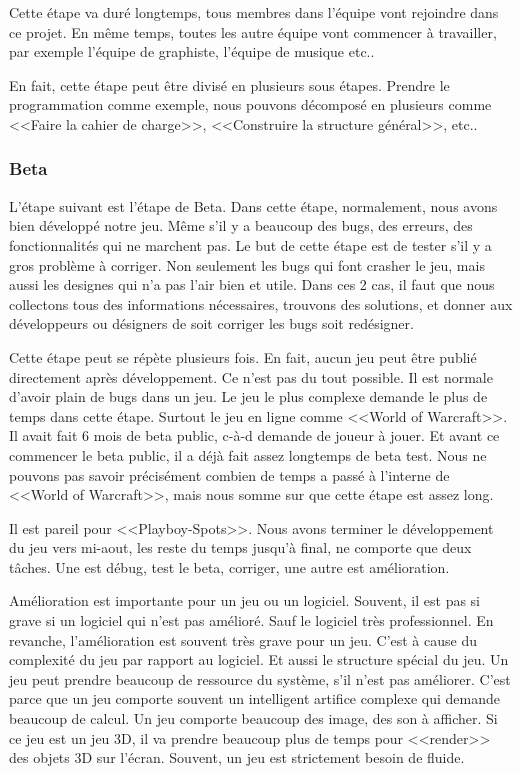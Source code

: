 Cette étape va duré longtemps, tous membres dans l'équipe vont rejoindre dans ce projet. En même temps, toutes les autre équipe vont commencer à travailler, par exemple l'équipe de graphiste, l'équipe de musique etc.. 

En fait, cette étape peut être divisé en plusieurs sous étapes. Prendre le programmation comme exemple, nous pouvons décomposé en plusieurs comme <<Faire la cahier de charge>>, <<Construire la structure général>>, etc..


\subsubsection{Beta} %

L'étape suivant est l'étape de Beta. Dans cette étape, normalement, nous avons bien développé notre jeu. Même s'il y a beaucoup des bugs, des erreurs, des fonctionnalités qui ne marchent pas. Le but de cette étape est de tester s'il y a gros problème à corriger. Non seulement les bugs qui font crasher le jeu, mais aussi les designes qui n'a pas l'air bien et utile. Dans ces 2 cas, il faut que nous collectons tous des informations nécessaires, trouvons des solutions, et donner aux développeurs ou désigners de soit corriger les bugs soit redésigner. 

Cette étape peut se répète plusieurs fois. En fait, aucun jeu peut être publié directement après développement. Ce n'est pas du tout possible. Il est normale d'avoir plain de bugs dans un jeu. Le jeu le plus complexe demande le plus de temps dans cette étape. Surtout le jeu en ligne comme <<World of Warcraft>>. Il avait fait 6 mois de beta public, c-à-d demande de joueur à jouer. Et avant ce commencer le beta public, il a déjà fait assez longtemps de beta test. Nous ne pouvons pas savoir précisément combien de temps a passé à l'interne de <<World of Warcraft>>, mais nous somme sur que cette étape est assez long. 

Il est pareil pour <<Playboy-Spots>>. Nous avons terminer le développement du jeu vers mi-aout, les reste du temps jusqu'à final, ne comporte que deux tâches. Une est débug, test le beta, corriger, une autre est amélioration. 

Amélioration est importante pour un jeu ou un logiciel. Souvent, il est pas si grave si un logiciel qui n'est pas amélioré. Sauf le logiciel très professionnel. En revanche, l'amélioration est souvent très grave pour un jeu. C'est à cause du complexité du jeu par rapport au logiciel. Et aussi le structure spécial du jeu. Un jeu peut prendre beaucoup de ressource du système, s'il n'est pas améliorer. C'est parce que un jeu comporte souvent un intelligent artifice complexe qui demande beaucoup de calcul. Un jeu comporte beaucoup des image, des son à afficher. Si ce jeu est un jeu 3D, il va prendre beaucoup plus de temps pour <<render>> des objets 3D sur l'écran. Souvent, un jeu est strictement besoin de fluide. 

